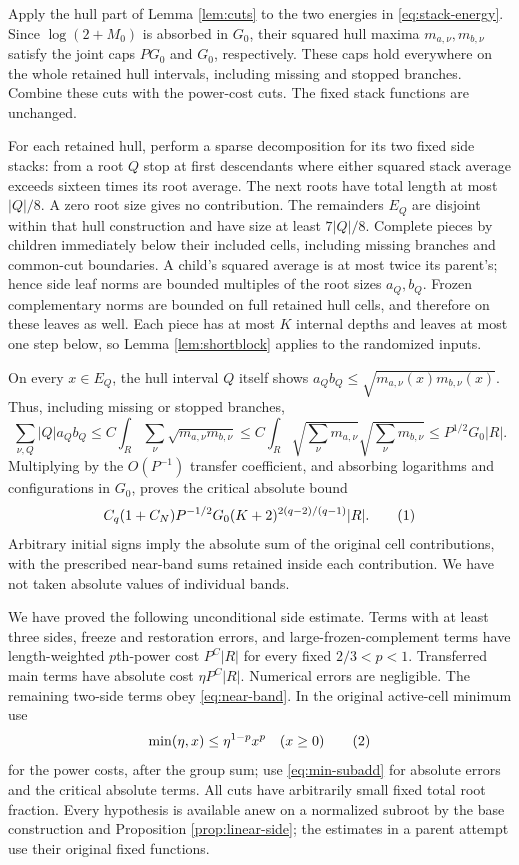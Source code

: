 \documentclass[11pt]{article}
\theoremstyle{definition}
\newcommand{\eqtag}[1]{\refstepcounter{equation}\tag{\theequation}\label{#1}}
\numberwithin{equation}{section}
\begin{document}
Apply the hull part of Lemma \ref{lem:cuts} to the two energies in \eqref{eq:stack-energy}. Since $\log(2+M_0)$ is absorbed in $G_0$, their squared hull maxima $m_{a,\nu},m_{b,\nu}$ satisfy the joint caps $PG_0$ and $G_0$, respectively. These caps hold everywhere on the whole retained hull intervals, including missing and stopped branches. Combine these cuts with the power-cost cuts. The fixed stack functions are unchanged.

For each retained hull, perform a sparse decomposition for its two fixed side stacks: from a root $Q$ stop at first descendants where either squared stack average exceeds sixteen times its root average. The next roots have total length at most $|Q|/8$. A zero root size gives no contribution. The remainders $E_Q$ are disjoint within that hull construction and have size at least $7|Q|/8$. Complete pieces by children immediately below their included cells, including missing branches and common-cut boundaries. A child's squared average is at most twice its parent's; hence side leaf norms are bounded multiples of the root sizes $a_Q,b_Q$. Frozen complementary norms are bounded on full retained hull cells, and therefore on these leaves as well. Each piece has at most $K$ internal depths and leaves at most one step below, so Lemma \ref{lem:shortblock} applies to the randomized inputs.

On every $x\in E_Q$, the hull interval $Q$ itself shows $a_Qb_Q\le\sqrt{m_{a,\nu}(x)m_{b,\nu}(x)}$. Thus, including missing or stopped branches,
\[
 \sum_{\nu,Q}|Q|a_Qb_Q
 \le C\int_R\sum_\nu\sqrt{m_{a,\nu}m_{b,\nu}}
 \le C\int_R\sqrt{\sum_\nu m_{a,\nu}}\sqrt{\sum_\nu m_{b,\nu}}
 \le P^{1/2}G_0|R|.
\]
Multiplying by the $O(P^{-1})$ transfer coefficient, and absorbing logarithms and configurations in $G_0$, proves the critical absolute bound
\[
 C_q(1+C_N)P^{-1/2}G_0(K+2)^{2(q-2)/(q-1)}|R|.
 \eqtag{eq:near-band}
\]
Arbitrary initial signs imply the absolute sum of the original cell contributions, with the prescribed near-band sums retained inside each contribution. We have not taken absolute values of individual bands.

We have proved the following unconditional side estimate. Terms with at least three sides, freeze and restoration errors, and large-frozen-complement terms have length-weighted $p$th-power cost $P^C|R|$ for every fixed $2/3<p<1$. Transferred main terms have absolute cost $\eta P^C|R|$. Numerical errors are negligible. The remaining two-side terms obey \eqref{eq:near-band}. In the original active-cell minimum use
\[
 \min(\eta,x)\le\eta^{1-p}x^p\quad(x\ge0)
 \eqtag{eq:min-power}
\]
for the power costs, after the group sum; use \eqref{eq:min-subadd} for absolute errors and the critical absolute terms. All cuts have arbitrarily small fixed total root fraction. Every hypothesis is available anew on a normalized subroot by the base construction and Proposition \ref{prop:linear-side}; the estimates in a parent attempt use their original fixed functions.
\end{document}
